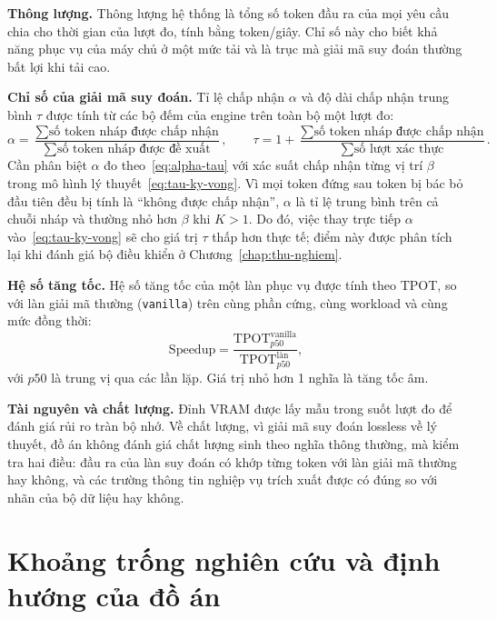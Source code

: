 \textbf{Thông lượng.} Thông lượng hệ thống là tổng số token đầu ra của mọi yêu cầu chia cho thời gian của lượt đo, tính bằng token/giây. Chỉ số này cho biết khả năng phục vụ của máy chủ ở một mức tải và là trục mà giải mã suy đoán thường bất lợi khi tải cao.

\textbf{Chỉ số của giải mã suy đoán.} Tỉ lệ chấp nhận $\alpha$ và độ dài chấp nhận trung bình $\tau$ được tính từ các bộ đếm của engine trên toàn bộ một lượt đo:
\begin{equation}\label{eq:alpha-tau}
  \alpha = \frac{\sum \text{số token nháp được chấp nhận}}{\sum \text{số token nháp được đề xuất}}, \qquad
  \tau = 1 + \frac{\sum \text{số token nháp được chấp nhận}}{\sum \text{số lượt xác thực}}.
\end{equation}
Cần phân biệt $\alpha$ đo theo~\eqref{eq:alpha-tau} với xác suất chấp nhận từng vị trí $\beta$ trong mô hình lý thuyết~\eqref{eq:tau-ky-vong}. Vì mọi token đứng sau token bị bác bỏ đầu tiên đều bị tính là ``không được chấp nhận'', $\alpha$ là tỉ lệ trung bình trên cả chuỗi nháp và thường nhỏ hơn $\beta$ khi $K>1$. Do đó, việc thay trực tiếp $\alpha$ vào~\eqref{eq:tau-ky-vong} sẽ cho giá trị $\tau$ thấp hơn thực tế; điểm này được phân tích lại khi đánh giá bộ điều khiển ở Chương~\ref{chap:thu-nghiem}.

\textbf{Hệ số tăng tốc.} Hệ số tăng tốc của một làn phục vụ được tính theo TPOT, so với làn giải mã thường (\texttt{vanilla}) trên cùng phần cứng, cùng workload và cùng mức đồng thời:
\begin{equation}\label{eq:speedup-do}
  \text{Speedup} = \frac{\mathrm{TPOT}^{\text{vanilla}}_{p50}}{\mathrm{TPOT}^{\text{làn}}_{p50}},
\end{equation}
với $p50$ là trung vị qua các lần lặp. Giá trị nhỏ hơn 1 nghĩa là tăng tốc âm.

\textbf{Tài nguyên và chất lượng.} Đỉnh VRAM được lấy mẫu trong suốt lượt đo để đánh giá rủi ro tràn bộ nhớ. Về chất lượng, vì giải mã suy đoán lossless về lý thuyết, đồ án không đánh giá chất lượng sinh theo nghĩa thông thường, mà kiểm tra hai điều: đầu ra của làn suy đoán có khớp từng token với làn giải mã thường hay không, và các trường thông tin nghiệp vụ trích xuất được có đúng so với nhãn của bộ dữ liệu hay không.

\section{Khoảng trống nghiên cứu và định hướng của đồ án}
\label{sec:khoang-trong}

